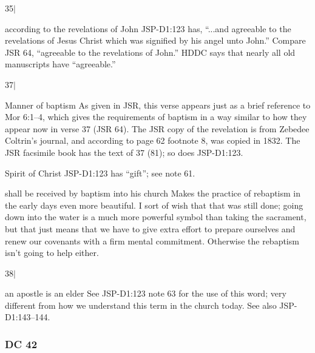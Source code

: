 		\begin{compactdesc}
		
		\item[35$\vert$]
		\begin{compactdesc}
		\item[according to the revelations of John] JSP-D1:123 has, ``...and agreeable to the revelations of Jesus Christ which was signified by his angel unto John.'' Compare JSR 64, ``agreeable to the revelations of John.'' HDDC says that nearly all old manuscripts have ``agreeable.'' 
		\end{compactdesc}
		
		\item[37$\vert$]
		\begin{compactdesc}
		\item[Manner of baptism] As given in JSR, this verse appears just as a brief reference to Mor 6:1--4, which gives the requirements of baptism in a way similar to how they appear now in verse 37 (JSR 64). The JSR copy of the revelation is from Zebedee Coltrin's journal, and according to page 62 footnote 8, was copied in 1832. The JSR facsimile book has the text of 37 (81); so does JSP-D1:123.
		\item[Spirit of Christ] JSP-D1:123 has ``gift''; see note 61.
		\item[shall be received by baptism into his church] Makes the practice of rebaptism in the early days even more beautiful. I sort of wish that that was still done; going down into the water is a much more powerful symbol than taking the sacrament, but that just means that we have to give extra effort to prepare ourselves and renew our covenants with a firm mental commitment. Otherwise the rebaptism isn't going to help either.
		\end{compactdesc}
		
		\item[38$\vert$]
		\begin{compactdesc}
		\item[an apostle is an elder] See JSP-D1:123 note 63 for the use of this word; very different from how we understand this term in the church today. See also JSP-D1:143--144.
		\end{compactdesc}
		
		\end{compactdesc}

	\subsubsection{DC 42} %
	
